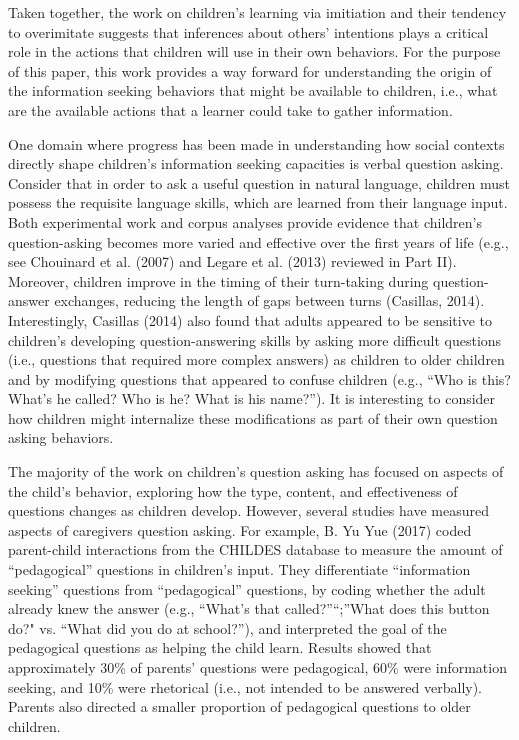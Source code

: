\documentclass[english,floatsintext,man]{apa6}
\theoremstyle{definition}
\theoremstyle{definition}
\theoremstyle{definition}
\theoremstyle{remark}
\begin{document}
Taken together, the work on children's learning via imitiation and their
tendency to overimitate suggests that inferences about others'
intentions plays a critical role in the actions that children will use
in their own behaviors. For the purpose of this paper, this work
provides a way forward for understanding the origin of the information
seeking behaviors that might be available to children, i.e., what are
the available actions that a learner could take to gather information.

One domain where progress has been made in understanding how social
contexts directly shape children's information seeking capacities is
verbal question asking. Consider that in order to ask a useful question
in natural language, children must possess the requisite language
skills, which are learned from their language input. Both experimental
work and corpus analyses provide evidence that children's
question-asking becomes more varied and effective over the first years
of life (e.g., see Chouinard et al. (2007) and Legare et al. (2013)
reviewed in Part II). Moreover, children improve in the timing of their
turn-taking during question-answer exchanges, reducing the length of
gaps between turns (Casillas, 2014). Interestingly, Casillas (2014) also
found that adults appeared to be sensitive to children's developing
question-answering skills by asking more difficult questions (i.e.,
questions that required more complex answers) as children to older
children and by modifying questions that appeared to confuse children
(e.g., \enquote{Who is this? What's he called? Who is he? What is his
name?}). It is interesting to consider how children might internalize
these modifications as part of their own question asking behaviors.

The majority of the work on children's question asking has focused on
aspects of the child's behavior, exploring how the type, content, and
effectiveness of questions changes as children develop. However, several
studies have measured aspects of caregivers question asking. For
example, B. Yu Yue (2017) coded parent-child interactions from the
CHILDES database to measure the amount of \enquote{pedagogical}
questions in children's input. They differentiate \enquote{information
seeking} questions from \enquote{pedagogical} questions, by coding
whether the adult already knew the answer (e.g., \enquote{What's that
called?}\enquote{;}What does this button do?" vs. \enquote{What did you
do at school?}), and interpreted the goal of the pedagogical questions
as helping the child learn. Results showed that approximately 30\% of
parents' questions were pedagogical, 60\% were information seeking, and
10\% were rhetorical (i.e., not intended to be answered verbally).
Parents also directed a smaller proportion of pedagogical questions to
older children.
\end{document}
